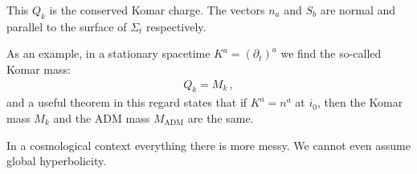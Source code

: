 \documentclass[main.tex]{subfiles}
\begin{document}
This \(Q_k\) is the conserved Komar charge. 
The vectors \(n_a\) and \(S_b\) are normal and parallel to the surface of \(\Sigma _t\) respectively. 

As an example, in a stationary spacetime \(K^{a} = (\partial_{t})^{a}\) we find the so-called Komar mass:
%
\begin{align}
Q_k = M_k 
\,,
\end{align}
%
and a useful theorem in this regard states that if \(K^{a} = n^a\) at \(i_0 \), then the Komar mass \(M_k\) and the ADM mass \(M _{\text{ADM}}\) are the same. 

In a cosmological context everything there is more messy. We cannot even assume global hyperbolicity.
\end{document}
